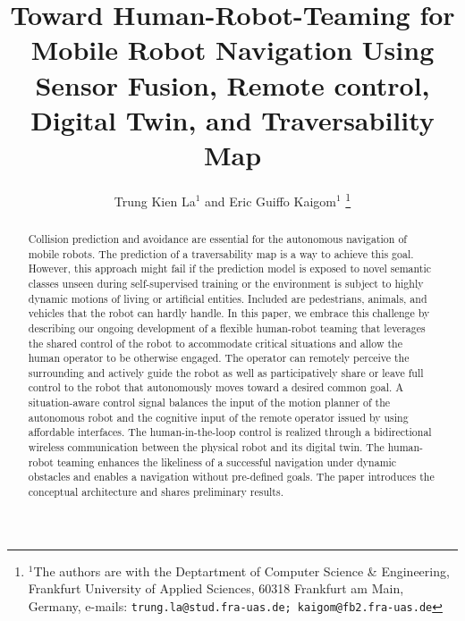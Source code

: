 \documentclass[letterpaper, 10 pt, conference]{ieeeconf}  %
\title{\LARGE \bf
Toward Human-Robot-Teaming for Mobile Robot Navigation Using
Sensor Fusion, Remote control, Digital Twin, and  Traversability Map
}
\author{Trung Kien La$^{1}$ and Eric Guiffo Kaigom$^{1}$%
\thanks{$^{1}$The authors are with the Deptartment of Computer Science \& Engineering,
        Frankfurt University of Applied Sciences, 60318 Frankfurt am Main, Germany, e-mails:
        {\tt\small trung.la@stud.fra-uas.de; kaigom@fb2.fra-uas.de}}%
}
\begin{document}
\maketitle
\thispagestyle{empty}
\pagestyle{empty}


\begin{abstract}

Collision prediction and avoidance are essential for the autonomous navigation of mobile robots. The prediction of a traversability map is a way to achieve this goal. However, this approach might fail if the prediction model is exposed to novel semantic classes unseen during self-supervised training or  the environment is subject to  highly dynamic motions of living or artificial entities. Included are pedestrians, animals, and  vehicles that the robot can hardly handle. In this paper, we  embrace this challenge by describing our ongoing development of a flexible human-robot teaming that leverages the shared control of the robot to accommodate critical situations and allow the human operator to be otherwise engaged. The operator can remotely perceive the surrounding and actively guide the robot as well as participatively share or leave full control to the robot that autonomously moves toward a desired common goal. A situation-aware control signal balances the input of the motion planner of the autonomous robot and the cognitive input of the  remote  operator issued by using affordable  interfaces. %
The human-in-the-loop control is realized through a bidirectional wireless communication between the physical robot and its  digital twin.  The human-robot teaming enhances the likeliness of a successful navigation under dynamic obstacles and enables a navigation without pre-defined goals. The paper introduces the conceptual architecture and shares preliminary results.

\end{abstract}


\end{document}
